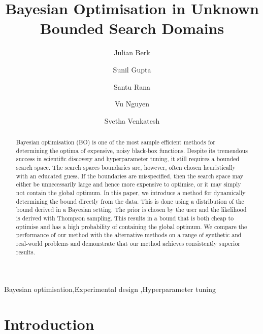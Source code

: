 \documentclass[preprint]{elsarticle}
\begin{document}
\begin{frontmatter}

\title{Bayesian Optimisation in Unknown Bounded Search Domains}

\author[1]{Julian Berk}
\author[1]{Sunil Gupta}
\author[1]{Santu Rana}
\author[2]{Vu Nguyen}
\author[1]{Svetha Venkatesh}

\address[1]{Deakin University, Applied Artificial Intelligence Institute, Geelong, Australia}
\address[2]{University of Oxford, Oxford, United Kingdom}

\begin{abstract}
Bayesian optimisation (BO) is one of the most sample efficient methods for determining the optima of expensive, noisy black-box functions. Despite its tremendous success in scientific discovery and hyperparameter tuning, it still requires a bounded search space. The search spaces boundaries are, however, often chosen heuristically with an educated guess. If the boundaries are misspecified, then the search space may either be unnecessarily large and hence more expensive to optimise, or it may simply not contain the global optimum. In this paper, we introduce a method for dynamically determining the bound directly from the data. This is done using a distribution of the bound derived in a Bayesian setting. The prior is chosen by the user and the likelihood is derived with Thompson sampling. This results in a bound that is both cheap to optimise and has a high probability of containing the global optimum. We compare the performance of our method with the alternative methods on a range of synthetic and real-world problems and demonstrate that our method achieves consistently superior results.
\end{abstract}

\begin{keyword}
Bayesian optimisation\sep Experimental design \sep Hyperparameter tuning
\end{keyword}

\end{frontmatter}

\linenumbers


\section{Introduction}
\end{document}

